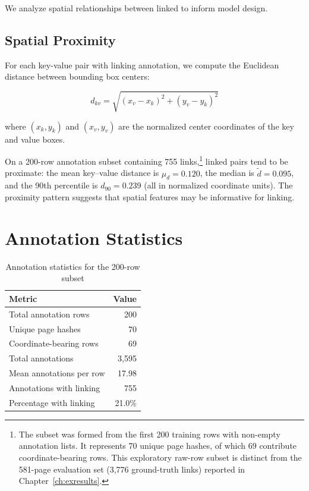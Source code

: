 We analyze spatial relationships between linked \kvps{} to inform model design.

\subsection{Spatial Proximity}

For each key-value pair with linking annotation, we compute the Euclidean distance between bounding box centers:

\begin{equation}
d_{kv} = \sqrt{(x_v - x_k)^2 + (y_v - y_k)^2}
\end{equation}

where $(x_k, y_k)$ and $(x_v, y_v)$ are the normalized center coordinates of the key and value boxes.

On a 200-row annotation subset containing 755 links,\footnote{The subset was formed from the first 200 training rows with non-empty annotation lists. It represents 70 unique page hashes, of which 69 contribute coordinate-bearing rows. This exploratory raw-row subset is distinct from the 581-page evaluation set (3{,}776 ground-truth links) reported in Chapter~\ref{ch:exresults}.} linked pairs tend to be proximate: the mean key--value distance is $\mu_d = 0.120$, the median is $\tilde{d} = 0.095$, and the 90th percentile is $d_{90} = 0.239$ (all in normalized coordinate units). The proximity pattern suggests that spatial features may be informative for linking.

\section{Annotation Statistics}
\label{sec:annotation_stats}

\begin{table}[h]
\centering
\caption{Annotation statistics for the 200-row subset}
\label{tab:ann_stats}
\begin{tabular}{@{}lr@{}}
\toprule
\textbf{Metric} & \textbf{Value} \\ \midrule
Total annotation rows & 200 \\
Unique page hashes & 70 \\
Coordinate-bearing rows & 69 \\
Total annotations & 3{,}595 \\
Mean annotations per row & 17.98 \\
Annotations with linking & 755 \\
Percentage with linking & 21.0\% \\ \bottomrule
\end{tabular}
\end{table}

